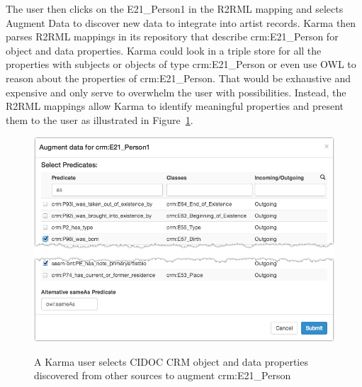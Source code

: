The user then clicks on the E21\_Person1 in the R2RML mapping and selects Augment Data to discover new data to integrate into artist records.  Karma then parses R2RML mappings in its repository that describe crm:E21\_Person for object and data properties.
Karma could look in a triple store for all the properties with subjects or objects of type crm:E21\_Person or even use OWL to reason about the properties of crm:E21\_Person.
That would be exhaustive and expensive and only serve to overwhelm the user with possibilities.
Instead, the R2RML mappings allow Karma to identify meaningful properties and present them to the user as illustrated in Figure~\ref{fig:search-screenshot}.
\begin{figure}
\begin{center}
\includegraphics[width=4.9in]{images/5-search.png}
\vspace{-3mm}
\caption{A Karma user selects CIDOC CRM object and data properties discovered from other sources to augment crm:E21\_Person}
\vspace{-2mm}
\label{fig:search-screenshot}
\end{center}
\vspace{-1.5em}
\end{figure}